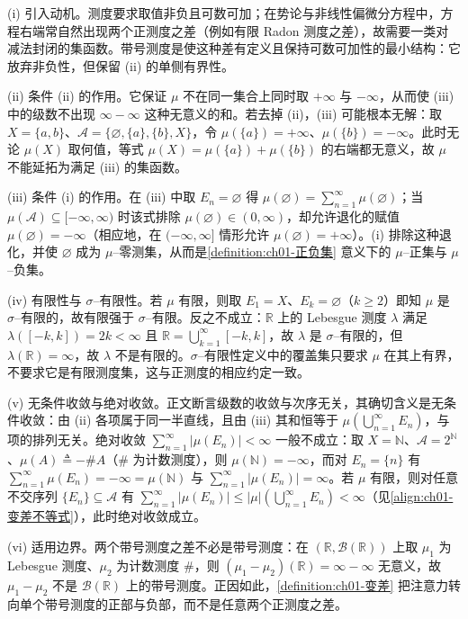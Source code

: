 \documentclass[../../main.tex]{subfiles}%
\begin{document}
\begin{remark}\label{remark:ch01-带号测度动机}
(i) 引入动机。测度要求取值非负且可数可加；在势论与非线性偏微分方程中，方程右端常自然出现两个正测度之差（例如有限 Radon 测度之差），故需要一类对减法封闭的集函数。带号测度是使这种差有定义且保持可数可加性的最小结构：它放弃非负性，但保留 (ii) 的单侧有界性。

(ii) 条件 (ii) 的作用。它保证 $\mu$ 不在同一集合上同时取 $+\infty$ 与 $-\infty$，从而使 (iii) 中的级数不出现 $\infty-\infty$ 这种无意义的和。若去掉 (ii)，(iii) 可能根本无解：取 $X=\{a,b\}$、$\mathcal{A}=\{\varnothing,\{a\},\{b\},X\}$，令 $\mu(\{a\})=+\infty$、$\mu(\{b\})=-\infty$。此时无论 $\mu(X)$ 取何值，等式 $\mu(X)=\mu(\{a\})+\mu(\{b\})$ 的右端都无意义，故 $\mu$ 不能延拓为满足 (iii) 的集函数。

(iii) 条件 (i) 的作用。在 (iii) 中取 $E_n=\varnothing$ 得 $\mu(\varnothing)=\sum_{n=1}^\infty\mu(\varnothing)$；当 $\mu(\mathcal{A})\subseteq[-\infty,\infty)$ 时该式排除 $\mu(\varnothing)\in(0,\infty)$，却允许退化的赋值 $\mu(\varnothing)=-\infty$（相应地，在 $(-\infty,\infty]$ 情形允许 $\mu(\varnothing)=+\infty$）。(i) 排除这种退化，并使 $\varnothing$ 成为 $\mu$--零测集，从而是\cref{definition:ch01-正负集} 意义下的 $\mu$--正集与 $\mu$--负集。

(iv) 有限性与 $\sigma$--有限性。若 $\mu$ 有限，则取 $E_1=X$、$E_k=\varnothing$（$k\geqslant2$）即知 $\mu$ 是 $\sigma$--有限的，故有限强于 $\sigma$--有限。反之不成立：$\mathbb{R}$ 上的 Lebesgue 测度 $\lambda$ 满足 $\lambda([-k,k])=2k<\infty$ 且 $\mathbb{R}=\bigcup_{k=1}^\infty[-k,k]$，故 $\lambda$ 是 $\sigma$--有限的，但 $\lambda(\mathbb{R})=\infty$，故 $\lambda$ 不是有限的。$\sigma$--有限性定义中的覆盖集只要求 $\mu$ 在其上有界，不要求它是有限测度集，这与正测度的相应约定一致。

(v) 无条件收敛与绝对收敛。正文断言级数的收敛与次序无关，其确切含义是无条件收敛：由 (ii) 各项属于同一半直线，且由 (iii) 其和恒等于 $\mu\left(\bigcup_{n=1}^\infty E_n\right)$，与项的排列无关。绝对收敛 $\sum_{n=1}^\infty|\mu(E_n)|<\infty$ 一般不成立：取 $X=\mathbb{N}$、$\mathcal{A}=2^{\mathbb{N}}$、$\mu(A)\triangleq-\#A$（$\#$ 为计数测度），则 $\mu(\mathbb{N})=-\infty$，而对 $E_n=\{n\}$ 有 $\sum_{n=1}^\infty\mu(E_n)=-\infty=\mu(\mathbb{N})$ 与 $\sum_{n=1}^\infty|\mu(E_n)|=\infty$。若 $\mu$ 有限，则对任意不交序列 $\{E_n\}\subseteq\mathcal{A}$ 有 $\sum_{n=1}^\infty|\mu(E_n)|\leqslant|\mu|\left(\bigcup_{n=1}^\infty E_n\right)<\infty$（见\eqref{align:ch01-变差不等式}），此时绝对收敛成立。

(vi) 适用边界。两个带号测度之差不必是带号测度：在 $(\mathbb{R},\mathcal{B}(\mathbb{R}))$ 上取 $\mu_1$ 为 Lebesgue 测度、$\mu_2$ 为计数测度 $\#$，则 $(\mu_1-\mu_2)(\mathbb{R})=\infty-\infty$ 无意义，故 $\mu_1-\mu_2$ 不是 $\mathcal{B}(\mathbb{R})$ 上的带号测度。正因如此，\cref{definition:ch01-变差} 把注意力转向单个带号测度的正部与负部，而不是任意两个正测度之差。
\end{remark}
\end{document}
